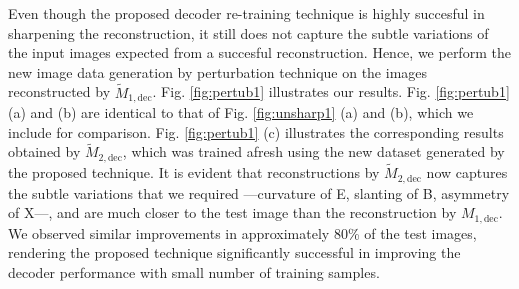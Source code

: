 Even though the proposed decoder re-training technique is highly succesful in sharpening the reconstruction, it still does not capture the subtle variations of the input images expected from a succesful reconstruction. Hence, we perform the new image data generation by perturbation technique on the images reconstructed by $\widetilde{M}_{1,\mathrm{dec}}$. Fig. \ref{fig:pertub1} illustrates our results. Fig. \ref{fig:pertub1} (a) and (b) are identical to that of Fig. \ref{fig:unsharp1} (a) and (b), which we include for  comparison. Fig. \ref{fig:pertub1} (c) illustrates the corresponding results obtained by $\widetilde{M}_{2,\mathrm{dec}}$, which was trained afresh using the new dataset generated by the proposed technique. It is evident that reconstructions by $\widetilde{M}_{2,\mathrm{dec}}$ now captures the subtle variations that we required ---curvature of E, slanting of B, asymmetry of X---, and are much closer to the test image than the reconstruction by $M_{1,\mathrm{dec}}$. We observed similar improvements in approximately 80\% of the test images, rendering the proposed technique significantly successful in improving the decoder performance with small number of training samples.


